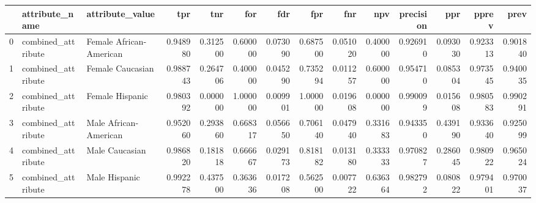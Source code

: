 \begin{tabular}{lllrrrrrrrrrrr}
\toprule
{} &      attribute\_name &          attribute\_value &       tpr &       tnr &       for &       fdr &       fpr &       fnr &       npv &  precision &       ppr &     pprev &      prev \\
\midrule
0 &  combined\_attribute &  Female African-American &  0.948980 &  0.312500 &  0.600000 &  0.073090 &  0.687500 &  0.051020 &  0.400000 &   0.926910 &  0.093030 &  0.923313 &  0.901840 \\
1 &  combined\_attribute &         Female Caucasian &  0.988743 &  0.264706 &  0.400000 &  0.045290 &  0.735294 &  0.011257 &  0.600000 &   0.954710 &  0.085304 &  0.973545 &  0.940035 \\
2 &  combined\_attribute &          Female Hispanic &  0.980392 &  0.000000 &  1.000000 &  0.009901 &  1.000000 &  0.019608 &  0.000000 &   0.990099 &  0.015608 &  0.980583 &  0.990291 \\
3 &  combined\_attribute &    Male African-American &  0.952060 &  0.293860 &  0.668317 &  0.056650 &  0.706140 &  0.047940 &  0.331683 &   0.943350 &  0.439190 &  0.933640 &  0.925099 \\
4 &  combined\_attribute &           Male Caucasian &  0.986820 &  0.181818 &  0.666667 &  0.029173 &  0.818182 &  0.013180 &  0.333333 &   0.970827 &  0.286045 &  0.980922 &  0.965024 \\
5 &  combined\_attribute &            Male Hispanic &  0.992278 &  0.437500 &  0.363636 &  0.017208 &  0.562500 &  0.007722 &  0.636364 &   0.982792 &  0.080822 &  0.979401 &  0.970037 \\
\bottomrule
\end{tabular}
